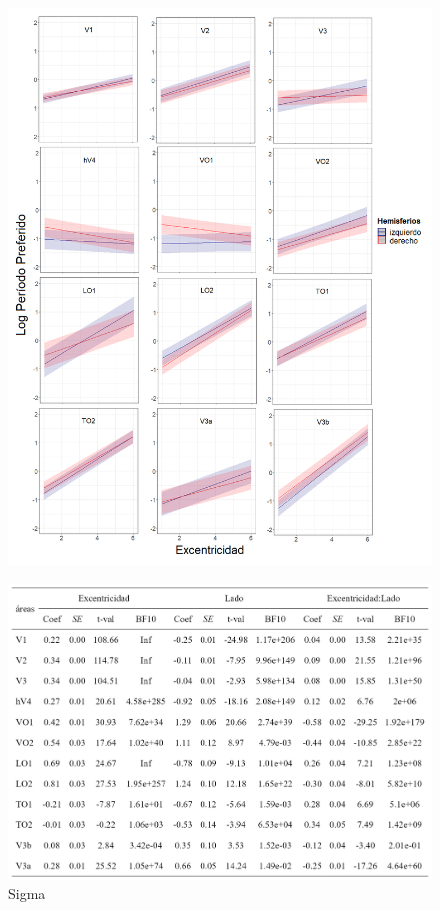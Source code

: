 \begin{figure}
	\centering
	\includegraphics[scale=0.6]{images/compuesto_rois_pp_vs_eccen_hem}
	\label{fig:pp_vs_eccen_hem}
\end{figure}

\begin{figure}
	\centering		
	\includegraphics[scale=0.8]{../images/table_sigma}
	\caption{Sigma}
\end{figure}

